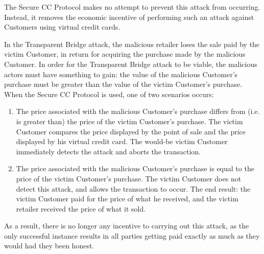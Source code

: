 The Secure CC Protocol makes no attempt to prevent this attack from occurring.
Instead, it removes the economic incentive of performing such an attack against Customers using virtual credit cards.

In the Transparent Bridge attack, the malicious retailer loses the sale paid by the victim Customer, in return for acquiring the purchase made by the malicious Customer.
In order for the Transparent Bridge attack to be viable, the malicious actors must have something to gain:
  the value of the malicious Customer's purchase must be greater than the value of the victim Customer's purchase.
When the Secure CC Protocol is used, one of two scenarios occurs:

\begin{enumerate}
\item The price associated with the malicious Customer's purchase differs from (i.e. is greater than) the price of the victim Customer's purchase.
The victim Customer compares the price displayed by the point of sale and the price displayed by his virtual credit card.
The would-be victim Customer immediately detects the attack and aborts the transaction.
\item The price associated with the malicious Customer's purchase is equal to the price of the victim Customer's purchase.
The victim Customer does not detect this attack, and allows the transaction to occur.
The end result: the victim Customer paid for the price of what he received, and the victim retailer received the price of what it sold.
\end{enumerate}

As a result, there is no longer any incentive to carrying out this attack, as the only successful instance results in all parties getting paid exactly as much as they would had they been honest.
